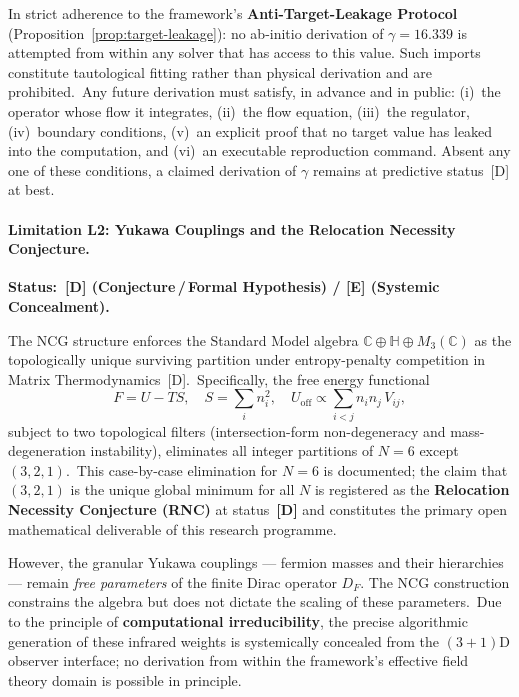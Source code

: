 In strict adherence to the framework's \textbf{Anti-Target-Leakage
Protocol} (Proposition~\ref{prop:target-leakage}): no ab-initio
derivation of $\gamma = 16.339$ is attempted from within any solver that
has access to this value. Such imports constitute tautological fitting
rather than physical derivation and are prohibited.\Aminus\ Any future
derivation must satisfy, in advance and in public: (i)~the operator
whose flow it integrates, (ii)~the flow equation, (iii)~the regulator,
(iv)~boundary conditions, (v)~an explicit proof that no target value has
leaked into the computation, and (vi)~an executable reproduction
command. Absent any one of these conditions, a claimed derivation of
$\gamma$ remains at predictive status~[D] at best.\Aminus

\paragraph{Limitation L2: Yukawa Couplings and the Relocation
  Necessity Conjecture.}
\textbf{Status:~[D] (Conjecture\,/\,Formal Hypothesis) /
  [E] (Systemic Concealment).}

The NCG structure enforces the Standard Model algebra
$\mathbb{C} \oplus \mathbb{H} \oplus M_3(\mathbb{C})$ as the
topologically unique surviving partition under entropy-penalty
competition in Matrix Thermodynamics~[D].\Dclass\ Specifically, the free
energy functional
\begin{equation}
  F = U - TS, \quad
  S = \textstyle\sum_i n_i^2, \quad
  U_{\text{off}} \propto \textstyle\sum_{i<j} n_i n_j \, V_{ij},
  \label{eq:free-energy}
\end{equation}
subject to two topological filters (intersection-form non-degeneracy and
mass-degeneration instability), eliminates all integer partitions of
$N=6$ except $(3,2,1)$.\Dclass\ This case-by-case elimination for $N=6$
is documented; the claim that $(3,2,1)$ is the unique global minimum for
all $N$ is registered as the \textbf{Relocation Necessity Conjecture
(RNC)} at status~\textbf{[D]} and constitutes the primary open
mathematical deliverable of this research programme.\Dclass

However, the granular Yukawa couplings — fermion masses and their
hierarchies — remain \emph{free parameters} of the finite Dirac operator
$D_F$. The NCG construction constrains the algebra but does not dictate
the scaling of these parameters.\Dclass\ Due to the principle of
\textbf{computational irreducibility}, the precise algorithmic generation
of these infrared weights is systemically concealed from the
$(3+1)$D observer interface; no derivation from within the framework's
effective field theory domain is possible in principle.\Eclass

